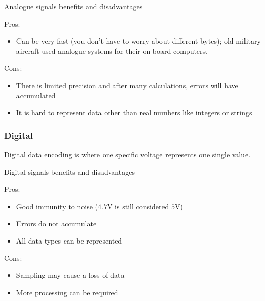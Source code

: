 \medskip
\begin{highlight}{Analogue signals benefits and disadvantages}
	\begin{minipage}[t]{0.45\linewidth}
		Pros:
		\begin{itemize}
			\item Can be very fast (you don't have to worry about different bytes); old military aircraft used analogue systems for their on-board computers.
		\end{itemize}
	\end{minipage}
	\hfill
	\begin{minipage}[t]{0.45\linewidth}
		Cons:
		\begin{itemize}
			\item There is limited precision and after many calculations, errors will have accumulated
			\item It is hard to represent data other than real numbers like integers or strings
		\end{itemize}
	\end{minipage}
\end{highlight}

\subsubsection{Digital}\label{ssub:digital}

Digital data encoding is where one specific voltage represents one single value.

\medskip
\begin{highlight}{Digital signals benefits and disadvantages}
	\begin{minipage}[t]{0.45\linewidth}
		Pros:
		\begin{itemize}
			\item Good immunity to noise (\(4.7\)V is still considered \(5\)V)
			\item Errors do not accumulate
			\item All data types can be represented
		\end{itemize}
	\end{minipage}
	\hfill
	\begin{minipage}[t]{0.45\linewidth}
		Cons:
		\begin{itemize}
			\item Sampling may cause a loss of data
			\item More processing can be required
		\end{itemize}
	\end{minipage}
\end{highlight}

